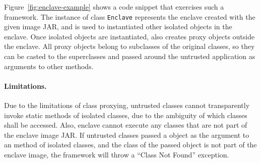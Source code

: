 
Figure~\ref{fig:enclave-example} shows a code snippet that exercises such a framework.
The instance of class {\tt Enclave} represents the enclave created with
the given image JAR,
and is used to instantiated other isolated objects in the enclave.
Once isolated objects are instantiated,
\sysname{} also creates proxy objects outside the enclave.
All proxy objects belong to subclasses of the original classes,
so they can be casted to the superclasses
and passed around the untrusted application as arguments to other methods.

\paragraph{Limitations.}
Due to the limitations of \java{} class proxying,
untrusted classes cannot transparently invoke static methods
of isolated classes,
due to the ambiguity of which classes shall be accessed.
Also, enclave cannot execute any classes
that are not part of the enclave image JAR.
If untrusted classes passed a object
as the argument to an method of isolated classes,
and the class of the passed object is not part of the enclave image,
the framework will throw a ``Class Not Found'' exception.

